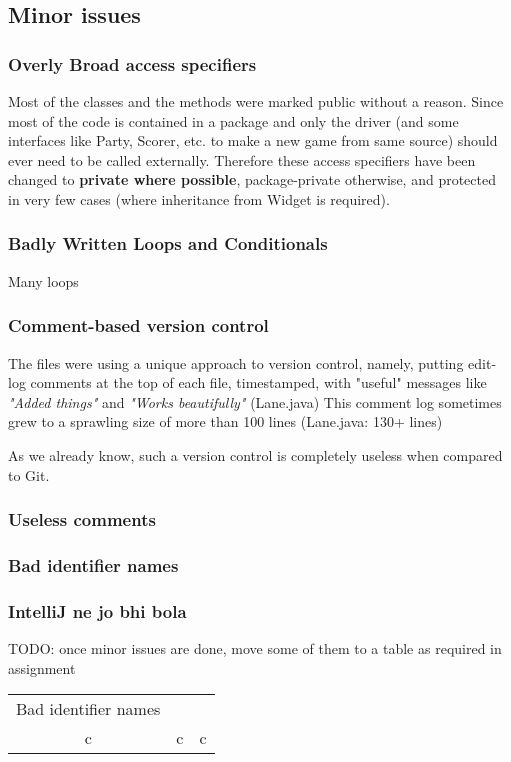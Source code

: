 \subsection{Minor issues}
\subsubsection{Overly Broad access specifiers}

Most of the classes and the methods were marked public without a reason. Since most of the code is contained in a package and only the driver (and some interfaces like Party, Scorer, etc. to make a new game from same source) should ever need to be called externally. Therefore these access specifiers have been changed to \textbf{private where possible}, package-private otherwise, and protected in very few cases (where inheritance from Widget is required).

\subsubsection{Badly Written Loops and Conditionals}

Many loops

\subsubsection{Comment-based version control}

The files were using a unique approach to version control, namely, putting edit-log comments at the top of each file, timestamped, with "useful" messages like \textit{"Added things"} and \textit{"Works beautifully"} (\textrm{Lane.java}) This comment log sometimes grew to a sprawling size of more than 100 lines (Lane.java: 130+ lines)

As we already know, such a version control is completely useless when compared to Git.

\subsubsection{Useless comments}


\subsubsection{Bad identifier names}


\subsubsection{IntelliJ ne jo bhi bola}



TODO: once minor issues are done, move some of them to a table as required in assignment
\begin{tabular}{ |c|c|c| }
    \hline
    Bad identifier names & \\
    c & c & c \\
    \hline
\end{tabular}